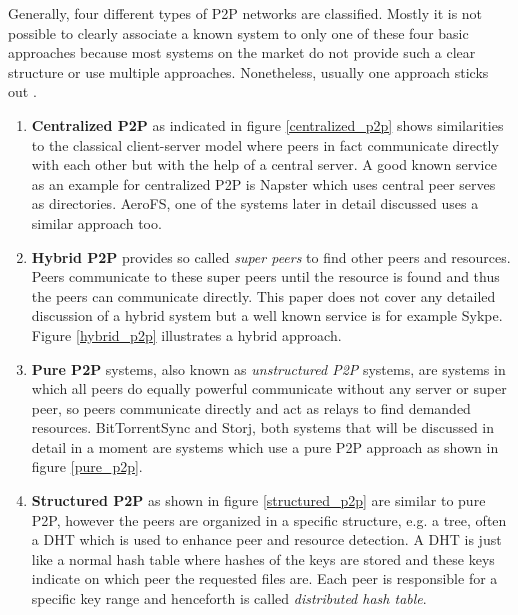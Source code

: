 Generally, four different types of P2P networks are classified. Mostly it is not possible to clearly associate a known system to only one of these four basic approaches because most systems on the market do not provide such a clear structure or use multiple approaches. Nonetheless, usually one approach sticks out \cite{p2p-introduction:tomp2p}.
\begin{enumerate}
	\item \textbf{Centralized P2P} as indicated in figure \ref{centralized_p2p} shows similarities to the classical client-server model where peers in fact communicate directly with each other but with the help of a central server. A good known service as an example for centralized P2P is Napster which uses central peer serves as directories. AeroFS, one of the systems later in detail discussed uses a similar approach too.

	\item \textbf{Hybrid P2P} provides so called \textit{super peers} to find other peers and resources. Peers communicate to these super peers until the resource is found and thus the peers can communicate directly. This paper does not cover any detailed discussion of a hybrid system but a well known service is for example Sykpe. Figure \ref{hybrid_p2p} illustrates a hybrid approach.
	
	\item \textbf{Pure P2P} systems, also known as \textit{unstructured P2P} systems, are systems in which all peers do equally powerful communicate without any server or super peer, so peers communicate directly and act as relays to find demanded resources. BitTorrentSync and Storj, both systems that will be discussed in detail in a moment are systems which use a pure P2P approach as shown in figure \ref{pure_p2p}.
	
	\item \textbf{Structured P2P} as shown in figure \ref{structured_p2p} are similar to pure P2P, however the peers are organized in a specific structure, e.g. a tree, often a DHT which is used to enhance peer and resource detection. A DHT is just like a normal hash table where hashes of the keys are stored and these keys indicate on which peer the requested files are. Each peer is responsible for a specific key range and henceforth is called \textit{distributed hash table}.
\end{enumerate}

